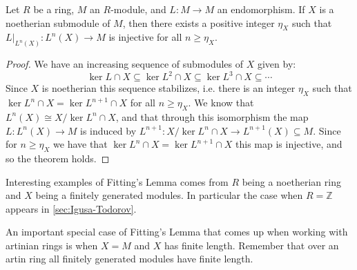 \begin{theorem}\label{thm:Fittings_lemma}
	Let $R$ be a ring, $M$ an $R$-module, and $L\colon M \to M$ an endomorphism. If $X$ is a noetherian submodule of $M$, then there exists a positive integer $\eta_X$ such that $L|_{L^n(X)}\colon L^n(X) \to M$ is injective for all $n \geq \eta_X$.
	\begin{proof}
		We have an increasing sequence of submodules of $X$ given by:
		$$\ker L \cap X \subseteq \ker L^2 \cap X \subseteq \ker L^3 \cap X \subseteq \cdots$$
		Since $X$ is noetherian this sequence stabilizes, i.e. there is an integer $\eta_X$ such that $\ker L^n \cap X = \ker L^{n+1} \cap X$ for all $n \geq \eta_X$. We know that $L^n(X) \cong X / \ker L^n \cap X$, and that through this isomorphism the map $L \colon L^n(X) \to M$ is induced by $L^{n+1} \colon X / \ker L^n \cap X \to L^{n+1}(X) \subseteq M$. Since for $n \geq \eta_X$ we have that $\ker L^n \cap X = \ker L^{n+1}\cap X$ this map is injective, and so the theorem holds.
	\end{proof}
\end{theorem}

Interesting examples of Fitting's Lemma comes from $R$ being a noetherian ring and $X$ being a finitely generated modules. In particular the case when $R = \mathbb Z$ appears in \cref{sec:Igusa-Todorov}. 

An important special case of Fitting's Lemma that comes up when working with artinian rings is when $X=M$ and $X$ has finite length. Remember that over an artin ring all finitely generated modules have finite length.

